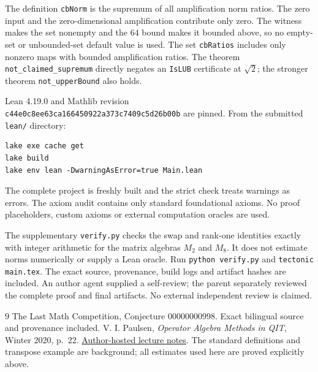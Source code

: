 \documentclass[11pt]{article}
\begin{document}
The definition \texttt{cbNorm} is the supremum of all
amplification norm ratios. The zero input and the
zero-dimensional amplification contribute only zero.
The witness makes the set nonempty and the $64$ bound
makes it bounded above, so no empty-set or unbounded-set
default value is used. The set \texttt{cbRatios} includes
only nonzero maps with bounded amplification ratios.
The theorem \texttt{not\_claimed\_supremum} directly
negates an \texttt{IsLUB} certificate at $\sqrt2$;
the stronger theorem \texttt{not\_upperBound} also holds.

Lean 4.19.0 and Mathlib revision\\
\texttt{c44e0c8ee63ca166450922a373c7409c5d26b00b}
are pinned. From the submitted \texttt{lean/} directory:
\begin{verbatim}
lake exe cache get
lake build
lake env lean -DwarningAsError=true Main.lean
\end{verbatim}
The complete project is freshly built and the strict
check treats warnings as errors. The axiom audit contains
only standard foundational axioms. No proof placeholders,
custom axioms or external computation oracles are used.

The supplementary \texttt{verify.py} checks the swap and
rank-one identities exactly with integer arithmetic for
the matrix algebras $M_2$ and $M_8$. It does not estimate norms
numerically or supply a Lean oracle. Run
\texttt{python verify.py} and \texttt{tectonic main.tex}.
The exact source, provenance, build logs and artifact
hashes are included. An author agent supplied a self-review;
the parent separately reviewed the complete proof and
final artifacts. No external independent review is claimed.

\begin{thebibliography}{9}
 The Last Math Competition, Conjecture
00000000998. Exact bilingual source and provenance included.
 V. I. Paulsen, \emph{Operator Algebra
Methods in QIT}, Winter 2020, p.~22.
\href{https://www.math.uwaterloo.ca/~vpaulsen/OpAlgQIT.pdf}{Author-hosted lecture notes}.
The standard definitions and transpose example are background;
all estimates used here are proved explicitly above.
\end{thebibliography}
\end{document}
